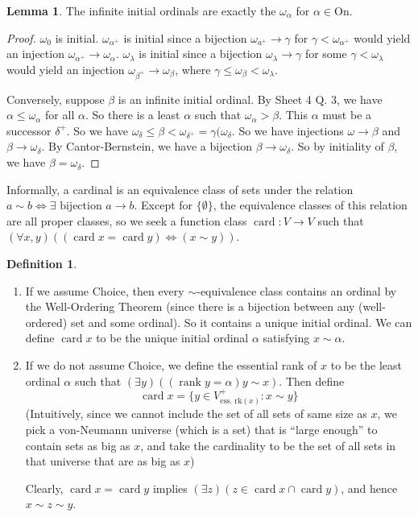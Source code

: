 \documentclass[a4paper]{article}
\theoremstyle{definition}
\newtheorem*{defi}{Definition}
\newtheorem*{lemma}{Lemma}
\newcommand{\On}{\mathrm{On}}
\DeclareMathOperator\rank{rank}
\DeclareMathOperator\card{card}
\begin{document}
\begin{lemma}
  The infinite initial ordinals are exactly the $\omega_\alpha$ for $\alpha\in \On$.
\end{lemma}

\begin{proof}
  $\omega_0$ is initial. $\omega_{\alpha^+}$ is initial since a bijection $\omega_{a^+} \to \gamma$ for $\gamma < \omega_{\alpha^+}$ would yield an injection $\omega_{\alpha^+} \to \omega_{\alpha}$. $\omega_\lambda$ is initial since a bijection $\omega_\lambda\to \gamma$ for some $\gamma < \omega_\lambda$ would yield an injection $\omega_{\beta^+} \to \omega_\beta$, where $\gamma \leq \omega_\beta < \omega_\lambda$.

  Conversely, suppose $\beta$ is an infinite initial ordinal. By Sheet 4 Q. 3, we have $\alpha \leq \omega_\alpha$ for all $\alpha$. So there is a least $\alpha$ such that $\omega_{\alpha} > \beta$. This $\alpha$ must be a successor $\delta^+$. So we have $\omega_\delta \leq \beta < \omega_{\delta^+} = \gamma(\omega_\delta$. So we have injections $\omega \to \beta$ and $\beta \to \omega_\delta$. By Cantor-Bernstein, we have a bijection $\beta\to \omega_\delta$. So by initiality of $\beta$, we have $\beta = \omega_\delta$.
\end{proof}

Informally, a cardinal is an equivalence class of sets under the relation $a\sim b\Leftrightarrow \exists \text{ bijection } a\to b$. Except for $\{\emptyset\}$, the equivalence classes of this relation are all proper classes, so we seek a function class $\card: V\to V$ such that $(\forall x, y)((\card x = \card y)\Leftrightarrow (x\sim y))$.

\begin{defi}\leavevmode
  \begin{enumerate}[label=(\alph{*})]
  \item If we assume Choice, then every $\sim$-equivalence class contains an ordinal by the Well-Ordering Theorem (since there is a bijection between any (well-ordered) set and some ordinal). So it contains a unique initial ordinal. We can define $\card x$ to be the unique initial ordinal $\alpha$ satisfying $x\sim \alpha$.
  \item If we do not assume Choice, we define the essential rank of $x$ to be the least ordinal $\alpha$ such that $(\exists y)((\rank y = \alpha)y\sim x)$. Then define
    \[
    \card x = \{y\in V_{\text{ess. rk}(x)}^+ : x\sim y\}
    \]
    (Intuitively, since we cannot include the set of all sets of same size as $x$, we pick a von-Neumann universe (which is a set) that is ``large enough'' to contain sets as big as $x$, and take the cardinality to be the set of all sets in that universe that are as big as $x$)

    Clearly, $\card x = \card y$ implies $(\exists z)(z\in \card x\cap \card y)$, and hence $x\sim z\sim y$.
  \end{enumerate}
\end{defi}
\end{document}
